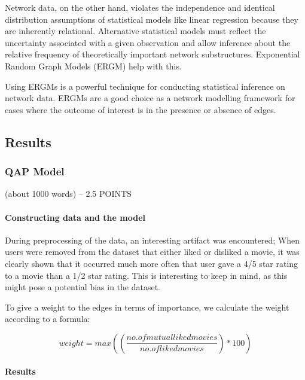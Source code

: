 \documentclass[
  man]{apa6}
\begin{document}
Network data, on the other hand, violates the independence and identical
distribution assumptions of statistical models like linear regression
because they are inherently relational. Alternative statistical models
must reflect the uncertainty associated with a given observation and
allow inference about the relative frequency of theoretically important
network substructures. Exponential Random Graph Models (ERGM) help with
this.

Using ERGMs is a powerful technique for conducting statistical inference
on network data. ERGMs are a good choice as a network modelling
framework for cases where the outcome of interest is in the presence or
absence of edges.

\hypertarget{results}{%
\subsection{Results}\label{results}}

\hypertarget{qap-model}{%
\subsubsection{QAP Model}\label{qap-model}}

(about 1000 words) -- 2.5 POINTS

\hypertarget{constructing-data-and-the-model}{%
\paragraph{Constructing data and the
model}\label{constructing-data-and-the-model}}

During preprocessing of the data, an interesting artifact was
encountered; When users were removed from the dataset that either liked
or disliked a movie, it was clearly shown that it occurred much more
often that user gave a 4/5 star rating to a movie than a 1/2 star
rating. This is interesting to keep in mind, as this might pose a
potential bias in the dataset.

To give a weight to the edges in terms of importance, we calculate the
weight according to a formula:

\[weight = max((\frac{no. of mutual liked movies}{
no. of liked movies})*100) \]

\hypertarget{results-1}{%
\paragraph{Results}\label{results-1}}
\end{document}
